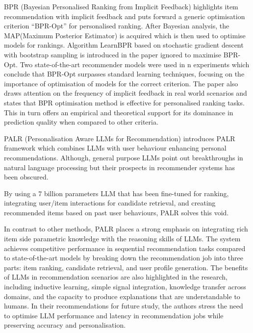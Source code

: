 \documentclass[conference]{IEEEtran}
\begin{document}
BPR (Bayesian Personalised Ranking from Implicit Feedback) \cite{rendle2012bpr} highlights item recommendation with implicit feedback and puts forward a generic optimisation criterion “BPR-Opt” for personalised ranking. After Bayesian analysis, the MAP(Maximum Posterior Estimator) is acquired which is then used to optimise models for rankings. Algorithm LearnBPR based on stochastic gradient descent with bootstrap sampling is introduced in the paper ignored to maximise BPR-Opt. Two state-of-the-art recommender models were used in n experiments which conclude  that BPR-Opt surpasses standard learning techniques, focusing on the importance of optimisation of  models for the correct criterion. The paper also draws attention on the frequency of implicit feedback in real world scenarios and states that  BPR optimisation method is effective for personalised ranking tasks. This in turn offers an empirical and theoretical support for its dominance in prediction quality when compared to other criteria.

PALR (Personalisation Aware LLMs for Recommendation) \cite{chen2023palr} introduces PALR framework which combines LLMs with user behaviour enhancing personal recommendations. Although, general purpose LLMs point out breakthroughs in natural language processing but their prospects  in recommender systems has been obscured.

By using a 7 billion parameters LLM that has been fine-tuned for ranking, integrating user/item interactions for candidate retrieval, and creating recommended items based on past user behaviours, PALR solves this void.

In contrast to other methods, PALR places a strong emphasis on integrating rich item side parametric knowledge with the reasoning skills of LLMs. The system achieves competitive performance in sequential recommendation tasks compared to state-of-the-art models by breaking down the recommendation job into three parts: item ranking, candidate retrieval, and user profile generation. The benefits of LLMs in recommendation scenarios are also highlighted in the research, including inductive learning, simple signal integration, knowledge transfer across domains, and the capacity to produce explanations that are understandable to humans. In their recommendations for future study, the authors stress the need to optimise LLM performance and latency in recommendation jobs while preserving accuracy and personalisation.
\end{document}
